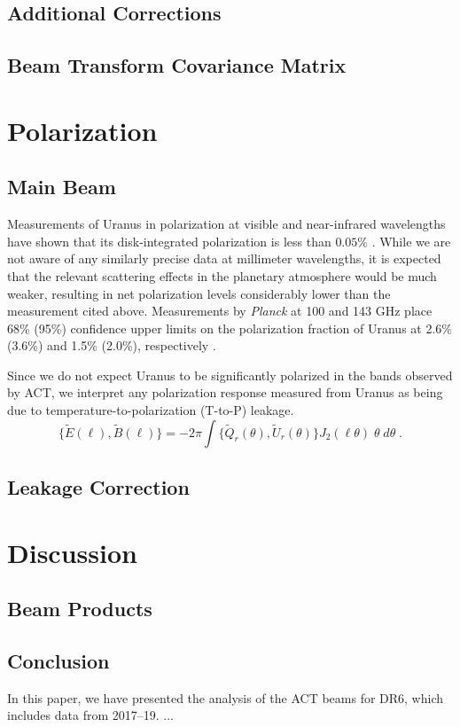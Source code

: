 \subsection{Additional Corrections}
\label{subsec:add_corr}
\subsection{Beam Transform Covariance Matrix}
\label{subsec:trans_covmat}


\section{Polarization}
\label{sec:pol}

\subsection{Main Beam}
\label{subsec:pol_main}

Measurements of Uranus in polarization at visible and near-infrared wavelengths have shown that its disk-integrated polarization is less than $0.05\%$ \citep{schmid}. While we are not aware of any similarly precise data at  millimeter wavelengths, it is expected that the relevant scattering effects in the planetary atmosphere would be much weaker, resulting in net polarization levels considerably lower than the measurement cited above. Measurements by \textit{Planck} at 100 and 143 GHz place 68\% (95\%) confidence upper limits on the polarization fraction of Uranus at 2.6\% (3.6\%) and 1.5\% (2.0\%), respectively \citep{planck_planets}.

Since we do not expect Uranus to be significantly polarized in the bands observed by ACT, we interpret any polarization response measured from Uranus as being due to temperature-to-polarization (T-to-P) leakage. 
\begin{equation}
\label{eq:trans_e_b}
    \{\tilde{E}(\ell), \tilde{B}(\ell)\} = -2\pi\int \{\tilde{Q}_r(\theta),\tilde{U}_r(\theta) \} J_2(\ell\theta)\;\theta\;d\theta \; .
\end{equation}


\subsection{Leakage Correction}
\label{subsec:pol_corr}

\section{Discussion}
\label{sec:disc}

\subsection{Beam Products}
\label{subsec:prods}

\subsection{Conclusion}
\label{subsec:concl}

In this paper, we have presented the analysis of the ACT beams for DR6, which includes data from 2017--19. ...

